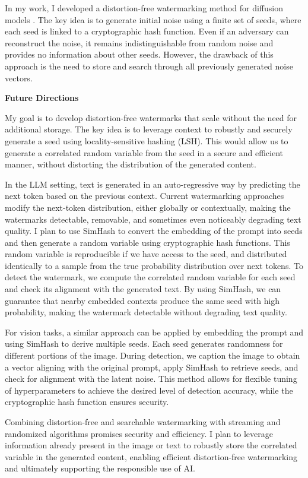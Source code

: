 \documentclass[11pt]{article}
\begin{document}
{In my work, I developed a distortion-free watermarking method for diffusion models \cite{arabi2024hidden}. The key idea is to generate initial noise using a finite set of seeds, where each seed is linked to a cryptographic hash function. Even if an adversary can reconstruct the noise, it remains indistinguishable from random noise and provides no information about other seeds. However, the drawback of this approach is the need to store and search through all previously generated noise vectors.

{ \large \textbf{Future Directions}}

My goal is to develop distortion-free watermarks that scale without the need for additional storage.
The key idea is to leverage context to robustly and securely generate a seed using locality-sensitive hashing (LSH).
This would allow us to generate a correlated random variable from the seed in a secure and efficient manner, without distorting the distribution of the generated content.

In the LLM setting, text is generated in an auto-regressive way by predicting the next token based on the previous context. Current watermarking approaches modify the next-token distribution, either globally or contextually, making the watermarks detectable, removable, and sometimes even noticeably degrading text quality. I plan to use SimHash to convert the embedding of the prompt into seeds and then generate a random variable using cryptographic hash functions. This random variable is reproducible if we have access to the seed, and distributed identically to a sample from the true probability distribution over next tokens. To detect the watermark, we compute the correlated random variable for each seed and check its alignment with the generated text. By using SimHash, we can guarantee that nearby embedded contexts produce the same seed with high probability, making the watermark detectable without degrading text quality.

For vision tasks, a similar approach can be applied by embedding the prompt and using SimHash to derive multiple seeds. Each seed generates randomness for different portions of the image. During detection, we caption the image to obtain a vector aligning with the original prompt, apply SimHash to retrieve seeds, and check for alignment with the latent noise. This method allows for flexible tuning of hyperparameters to achieve the desired level of detection accuracy, while the cryptographic hash function ensures security.

Combining distortion-free and searchable watermarking with streaming and randomized algorithms promises security and efficiency. I plan to leverage information already present in the image or text to robustly store the correlated variable in the generated content, enabling efficient distortion-free watermarking and ultimately supporting the responsible use of AI.

}
\end{document}
